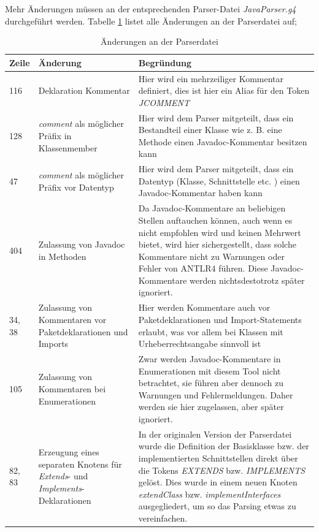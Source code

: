 Mehr Änderungen müssen an der entsprechenden Parser-Datei \textit{JavaParser.g4} durchgeführt werden.  Tabelle \ref{tab:parser_changes} listet alle Änderungen an der Parserdatei auf;
\begin{table}[h!]
    \centering
    \begin{tabular}{m{0.75cm}|m{4cm}|m{10cm}}
        Zeile & Änderung & Begründung \\
         \hline
        116 & Deklaration Kommentar & Hier wird ein mehrzeiliger Kommentar definiert, dies ist hier ein Alias für den Token \textit{JCOMMENT}\\
        \hline
        128 & \textit{comment} als möglicher Präfix in Klassenmember & Hier wird dem Parser mitgeteilt, dass ein Bestandteil einer Klasse wie z. B. eine Methode einen Javadoc-Kommentar besitzen kann\\
        \hline
        47 & \textit{comment} als möglicher Präfix vor Datentyp & Hier wird dem Parser mitgeteilt, dass ein Datentyp (Klasse, Schnittstelle etc. ) einen Javadoc-Kommentar haben kann \\
        \hline
        404 & Zulassung von Javadoc in Methoden & Da Javadoc-Kommentare an beliebigen Stellen auftauchen können, auch wenn es nicht empfohlen wird und keinen Mehrwert bietet, wird hier sichergestellt, dass solche Kommentare nicht zu Warnungen oder Fehler von ANTLR4 führen. Diese Javadoc-Kommentare werden nichtsdestotrotz später ignoriert.\\
        \hline
        34, 38& Zulassung von Kommentaren vor Paketdeklarationen und Imports & Hier werden Kommentare auch vor Paketdeklarationen und Import-Statements erlaubt, was vor allem bei Klassen mit Urheberrechtsangabe sinnvoll ist\\
        \hline
        105 & Zulassung von Kommentaren bei Enumerationen & Zwar werden Javadoc-Kommentare in Enumerationen mit diesem Tool nicht betrachtet, sie führen aber dennoch zu Warnungen und Fehlermeldungen. Daher werden sie hier zugelassen, aber später ignoriert. \\
        \hline
        82, 83 & Erzeugung eines separaten Knotens für \textit{Extends}- und \textit{Implements}-Deklarationen & In der originalen Version der Parserdatei wurde die Definition der Basisklasse bzw. der implementierten Schnittstellen direkt über die Tokens \textit{EXTENDS} bzw. \textit{IMPLEMENTS} gelöst. Dies wurde in einem neuen Knoten \textit{extendClass} bzw. \textit{implementInterfaces} ausgegliedert, um so das Parsing etwas zu vereinfachen.  \\
         \hline
    \end{tabular}
    \caption{Änderungen an der Parserdatei}
    \label{tab:parser_changes}
\end{table}

